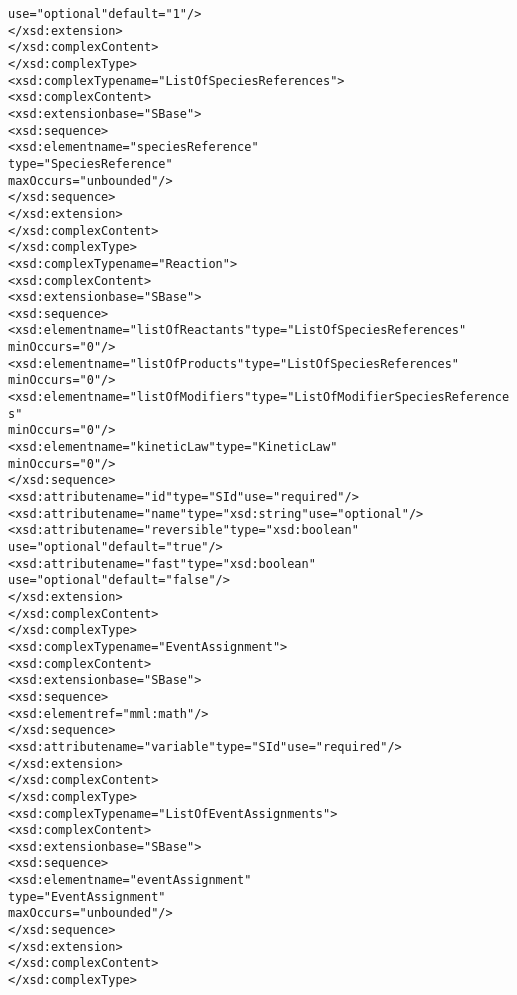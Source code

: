 \begin{alltt}
                               use="optional" default="1"/>
            </xsd:extension>
        </xsd:complexContent>
    </xsd:complexType>
    <xsd:complexType name="ListOfSpeciesReferences">
        <xsd:complexContent>
            <xsd:extension base="SBase">
                <xsd:sequence>
                    <xsd:element name="speciesReference" 
                                 type="SpeciesReference" 
                                 maxOccurs="unbounded"/>
                </xsd:sequence>
            </xsd:extension>
        </xsd:complexContent>
    </xsd:complexType>
    <xsd:complexType name="Reaction">
        <xsd:complexContent>
            <xsd:extension base="SBase">
                <xsd:sequence>
                    <xsd:element name="listOfReactants" type="ListOfSpeciesReferences" 
                                 minOccurs="0"/>
                    <xsd:element name="listOfProducts" type="ListOfSpeciesReferences" 
                                 minOccurs="0"/>
                    <xsd:element name="listOfModifiers" type="ListOfModifierSpeciesReferences" 
                                 minOccurs="0"/>
                    <xsd:element name="kineticLaw" type="KineticLaw" 
                                 minOccurs="0"/>
                </xsd:sequence>
                <xsd:attribute name="id" type="SId" use="required"/>
                <xsd:attribute name="name" type="xsd:string" use="optional"/>
                <xsd:attribute name="reversible" type="xsd:boolean" 
                               use="optional" default="true"/>
                <xsd:attribute name="fast" type="xsd:boolean" 
                               use="optional" default="false"/>
            </xsd:extension>
        </xsd:complexContent>
    </xsd:complexType>
    <xsd:complexType name="EventAssignment">
        <xsd:complexContent>
            <xsd:extension base="SBase">
                <xsd:sequence>
                    <xsd:element ref="mml:math"/>
                </xsd:sequence>
                <xsd:attribute name="variable" type="SId" use="required"/>
            </xsd:extension>
        </xsd:complexContent>
    </xsd:complexType>
    <xsd:complexType name="ListOfEventAssignments">
        <xsd:complexContent>
            <xsd:extension base="SBase">
                <xsd:sequence>
                    <xsd:element name="eventAssignment"
                                 type="EventAssignment" 
                                 maxOccurs="unbounded"/>
                </xsd:sequence>
            </xsd:extension>
        </xsd:complexContent>
    </xsd:complexType>

\end{alltt}
